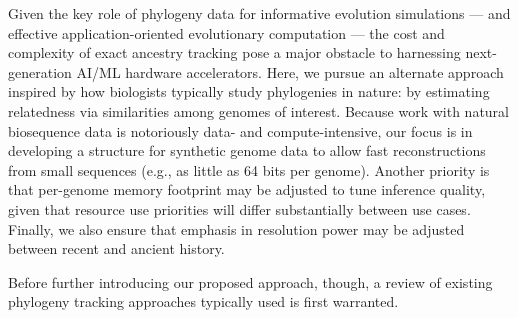 Given the key role of phylogeny data for informative evolution simulations --- and effective application-oriented evolutionary computation --- the cost and complexity of exact ancestry tracking pose a major obstacle to harnessing next-generation AI/ML hardware accelerators.
Here, we pursue an alternate approach inspired by how biologists typically study phylogenies in nature: by estimating relatedness via similarities among genomes of interest.
Because work with natural biosequence data is notoriously data- and compute-intensive, our focus is in developing a structure for synthetic genome data to allow fast reconstructions from small sequences (e.g., as little as 64 bits per genome).
Another priority is that per-genome memory footprint may be adjusted to tune inference quality, given that resource use priorities will differ substantially between use cases.
Finally, we also ensure that emphasis in resolution power may be adjusted between recent and ancient history.

Before further introducing our proposed approach, though, a review of existing phylogeny tracking approaches typically used is first warranted.






